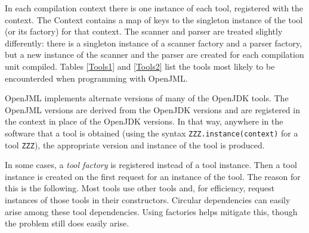 \documentclass{report}%
\begin{document}
In each compilation context there is one instance of each tool, registered with the context. The Context contains a map
of keys to the singleton instance of the tool (or its factory) for that context. The scanner and parser are treated slightly differently: there is a singleton instance of a scanner factory and a parser factory, but a new instance of the
scanner and the parser are created for each compilation unit compiled. Tables \ref{Tools1} and \ref{Tools2} list the tools
most likely to be encounterded when programming with OpenJML.

OpenJML implements
alternate versions of many of the OpenJDK tools. The OpenJML versions are derived from the OpenJDK versions and are 
registered in the context in place of the OpenJDK versions. In that way, anywhere in the software that a tool is
obtained (using the syntax {\tt ZZZ.instance(context)} for a tool {\tt ZZZ}), the appropriate version and instance
of the tool
is produced.

In some cases, a {\em tool factory} is registered instead of a tool instance. Then a tool instance is created on the
first request for an instance of the tool. The reason for this is the following. Most tools use other tools and, for
efficiency, request instances of those tools in their constructors. Circular dependencies can easily arise among these
tool dependencies. Using factories helps mitigate this, though the problem still does easily arise.
\end{document}
